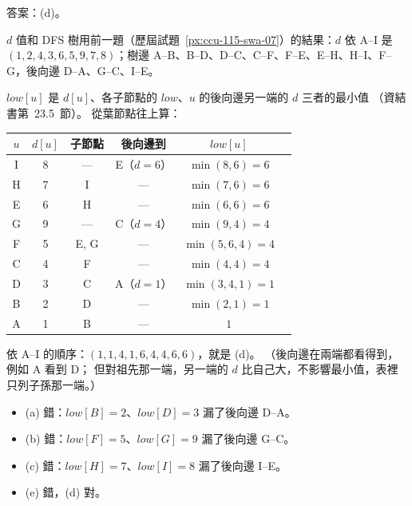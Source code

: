 \begin{pastsoln}
答案：(d)。

$d$ 值和 DFS 樹用前一題（歷屆試題~\ref{px:ccu-115-swa-07}）的結果：$d$ 依 A--I 是
$(1, 2, 4, 3, 6, 5, 9, 7, 8)$；樹邊 A--B、B--D、D--C、C--F、F--E、E--H、H--I、F--G，後向邊 D--A、G--C、I--E。

$\mathit{low}[u]$ 是 $d[u]$、各子節點的 $\mathit{low}$、$u$ 的後向邊另一端的 $d$ 三者的最小值
（資結書第~23.5~節）。 從葉節點往上算：
\begin{center}
\small
\begin{tabular}{cccccc}
\toprule
$u$ & $d[u]$ & 子節點 & 後向邊到 & $\mathit{low}[u]$ \\
\midrule
I & 8 & — & E（$d = 6$） & $\min(8, 6) = 6$ \\
H & 7 & I & — & $\min(7, 6) = 6$ \\
E & 6 & H & — & $\min(6, 6) = 6$ \\
G & 9 & — & C（$d = 4$） & $\min(9, 4) = 4$ \\
F & 5 & E, G & — & $\min(5, 6, 4) = 4$ \\
C & 4 & F & — & $\min(4, 4) = 4$ \\
D & 3 & C & A（$d = 1$） & $\min(3, 4, 1) = 1$ \\
B & 2 & D & — & $\min(2, 1) = 1$ \\
A & 1 & B & — & $1$ \\
\bottomrule
\end{tabular}
\end{center}
依 A--I 的順序：$(1, 1, 4, 1, 6, 4, 4, 6, 6)$，就是 (d)。 （後向邊在兩端都看得到，例如 A 看到 D；
但對祖先那一端，另一端的 $d$ 比自己大，不影響最小值，表裡只列子孫那一端。）
\begin{itemize}
\item (a) 錯：$\mathit{low}[B] = 2$、$\mathit{low}[D] = 3$ 漏了後向邊 D--A。
\item (b) 錯：$\mathit{low}[F] = 5$、$\mathit{low}[G] = 9$ 漏了後向邊 G--C。
\item (c) 錯：$\mathit{low}[H] = 7$、$\mathit{low}[I] = 8$ 漏了後向邊 I--E。
\item (e) 錯，(d) 對。
\end{itemize}
\end{pastsoln}
